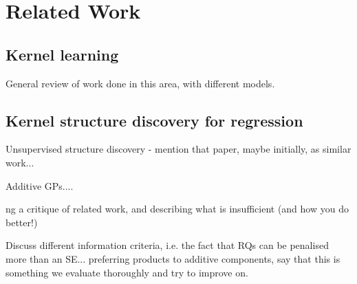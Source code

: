 \documentclass[a4paper,12pt ]{report}
\begin{document}
\clearpage

\chapter{Related Work} 

\section{Kernel learning}

General review of work done in this area, with different models.

\section{Kernel structure discovery for regression}

Unsupervised structure discovery - mention that paper, maybe initially, as similar work... 

Additive GPs....




ng a critique of related work, and describing what is insufficient (and how you do better!)


Discuss different information criteria, i.e. the fact that RQs can be penalised more than an SE... preferring products to additive components, say that this is something we evaluate thoroughly and try to improve on. 
\end{document}
